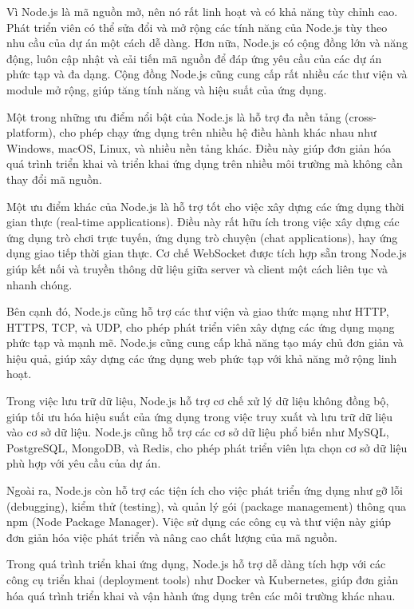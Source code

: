 Vì Node.js là mã nguồn mở, nên nó rất linh hoạt và có khả năng tùy chỉnh cao. Phát triển viên có thể sửa đổi và mở rộng các tính năng của Node.js tùy theo nhu cầu của dự án một cách dễ dàng. Hơn nữa, Node.js có cộng đồng lớn và năng động, luôn cập nhật và cải tiến mã nguồn để đáp ứng yêu cầu của các dự án phức tạp và đa dạng. Cộng đồng Node.js cũng cung cấp rất nhiều các thư viện và module mở rộng, giúp tăng tính năng và hiệu suất của ứng dụng.

Một trong những ưu điểm nổi bật của Node.js là hỗ trợ đa nền tảng (cross-platform), cho phép chạy ứng dụng trên nhiều hệ điều hành khác nhau như Windows, macOS, Linux, và nhiều nền tảng khác. Điều này giúp đơn giản hóa quá trình triển khai và triển khai ứng dụng trên nhiều môi trường mà không cần thay đổi mã nguồn. \cite{nodejs_2}

Một ưu điểm khác của Node.js là hỗ trợ tốt cho việc xây dựng các ứng dụng thời gian thực (real-time applications). Điều này rất hữu ích trong việc xây dựng các ứng dụng trò chơi trực tuyến, ứng dụng trò chuyện (chat applications), hay ứng dụng giao tiếp thời gian thực. Cơ chế WebSocket được tích hợp sẵn trong Node.js giúp kết nối và truyền thông dữ liệu giữa server và client một cách liên tục và nhanh chóng.

Bên cạnh đó, Node.js cũng hỗ trợ các thư viện và giao thức mạng như HTTP, HTTPS, TCP, và UDP, cho phép phát triển viên xây dựng các ứng dụng mạng phức tạp và mạnh mẽ. Node.js cũng cung cấp khả năng tạo máy chủ đơn giản và hiệu quả, giúp xây dựng các ứng dụng web phức tạp với khả năng mở rộng linh hoạt.

Trong việc lưu trữ dữ liệu, Node.js hỗ trợ cơ chế xử lý dữ liệu không đồng bộ, giúp tối ưu hóa hiệu suất của ứng dụng trong việc truy xuất và lưu trữ dữ liệu vào cơ sở dữ liệu. Node.js cũng hỗ trợ các cơ sở dữ liệu phổ biến như MySQL, PostgreSQL, MongoDB, và Redis, cho phép phát triển viên lựa chọn cơ sở dữ liệu phù hợp với yêu cầu của dự án.

Ngoài ra, Node.js còn hỗ trợ các tiện ích cho việc phát triển ứng dụng như gỡ lỗi (debugging), kiểm thử (testing), và quản lý gói (package management) thông qua npm (Node Package Manager). Việc sử dụng các công cụ và thư viện này giúp đơn giản hóa việc phát triển và nâng cao chất lượng của mã nguồn.

Trong quá trình triển khai ứng dụng, Node.js hỗ trợ dễ dàng tích hợp với các công cụ triển khai (deployment tools) như Docker và Kubernetes, giúp đơn giản hóa quá trình triển khai và vận hành ứng dụng trên các môi trường khác nhau.

